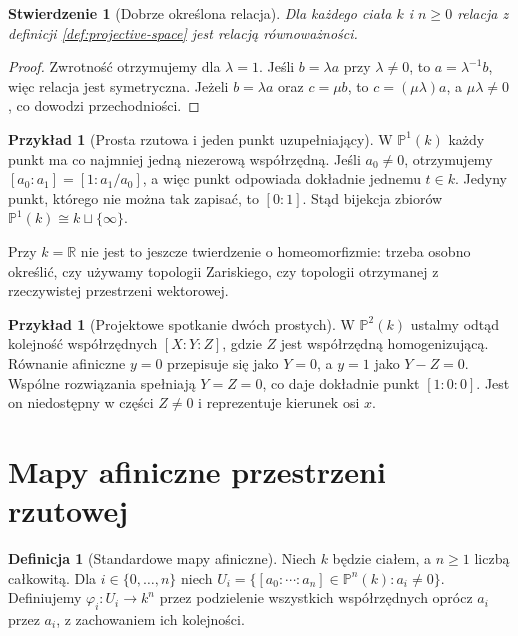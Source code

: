 \documentclass[11pt,a4paper,openany]{report}
\numberwithin{equation}{section}
\theoremstyle{plain}
\newtheorem{stwierdzenie}[twierdzenie]{Stwierdzenie}
\theoremstyle{definition}
\newtheorem{definicja}[twierdzenie]{Definicja}
\newtheorem{przyklad}[twierdzenie]{Przykład}
\theoremstyle{remark}
\newcommand{\R}{\mathbb R}
\newcommand{\PP}{\mathbb P}
\begin{document}
\begin{stwierdzenie}[Dobrze określona relacja]
Dla każdego ciała $k$ i $n\ge0$ relacja z definicji
\ref{def:projective-space} jest relacją równoważności.
\end{stwierdzenie}
\begin{proof}
Zwrotność otrzymujemy dla $\lambda=1$. Jeśli $b=\lambda a$
przy $\lambda\ne0$, to $a=\lambda^{-1}b$, więc relacja jest
symetryczna. Jeżeli $b=\lambda a$ oraz $c=\mu b$, to
$c=(\mu\lambda)a$, a $\mu\lambda\ne0$, co dowodzi
przechodniości.
\end{proof}

\begin{przyklad}[Prosta rzutowa i jeden punkt uzupełniający]
W $\PP^1(k)$ każdy punkt ma co najmniej jedną niezerową
współrzędną. Jeśli $a_0\ne0$, otrzymujemy
$[a_0:a_1]=[1:a_1/a_0]$, a więc punkt odpowiada dokładnie
jednemu $t\in k$. Jedyny punkt, którego nie można tak zapisać,
to $[0:1]$. Stąd bijekcja zbiorów
$\PP^1(k)\cong k\sqcup\{\infty\}$.

Przy $k=\R$ nie jest to jeszcze twierdzenie o homeomorfizmie:
trzeba osobno określić, czy używamy topologii Zariskiego,
czy topologii otrzymanej z rzeczywistej przestrzeni wektorowej.
\end{przyklad}

\begin{przyklad}[Projektowe spotkanie dwóch prostych]
W $\PP^2(k)$ ustalmy odtąd kolejność współrzędnych
$[X:Y:Z]$, gdzie $Z$ jest współrzędną homogenizującą.
Równanie afiniczne $y=0$ przepisuje się jako $Y=0$,
a $y=1$ jako $Y-Z=0$. Wspólne rozwiązania spełniają
$Y=Z=0$, co daje dokładnie punkt $[1:0:0]$.
Jest on niedostępny w części $Z\ne0$ i reprezentuje kierunek
osi $x$.
\end{przyklad}

\section{Mapy afiniczne przestrzeni rzutowej}

\begin{definicja}[Standardowe mapy afiniczne]
Niech $k$ będzie ciałem, a $n\ge1$ liczbą całkowitą.
Dla $i\in\{0,\ldots,n\}$ niech
$U_i=\{[a_0:\cdots:a_n]\in\PP^n(k):a_i\ne0\}$.
Definiujemy $\varphi_i:U_i\to k^n$ przez podzielenie
wszystkich współrzędnych oprócz $a_i$ przez $a_i$,
z zachowaniem ich kolejności.
\end{definicja}
\end{document}
